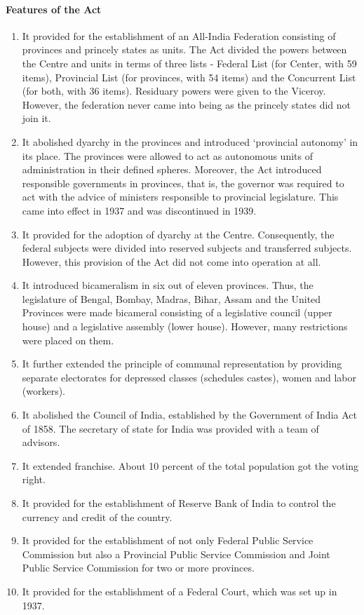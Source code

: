 \begin{multicols}{2}
\paragraph{Features of the Act}
\begin{enumerate}
  \item It provided for the establishment of an All-India Federation consisting of provinces and princely states as units. The Act divided the powers between the Centre and units in terms of three lists - Federal List (for Center, with 59 items), Provincial List (for provinces, with 54 items) and the Concurrent List (for both, with 36 items). Residuary powers were given to the Viceroy. However, the federation never came into being as the princely states did not join it.
  \item It abolished dyarchy in the provinces and introduced `provincial autonomy' in its place. The provinces were allowed to act as autonomous units of administration in their defined spheres. Moreover, the Act introduced responsible governments in provinces, that is, the governor was required to act with the advice of ministers responsible to provincial legislature. This came into effect in 1937 and was discontinued in 1939.
  \item It provided for the adoption of dyarchy at the Centre. Consequently, the federal subjects were divided into reserved subjects and transferred subjects. However, this provision of the Act did not come into operation at all.
  \item It introduced bicameralism in six out of eleven provinces. Thus, the legislature of Bengal, Bombay, Madras, Bihar, Assam and the United Provinces were made bicameral consisting of a legislative council (upper house) and a legislative assembly (lower house). However, many restrictions were placed on them.
  \item It further extended the principle of communal representation by providing separate electorates for depressed classes (schedules castes), women and labor (workers).
  \item It abolished the Council of India, established by the Government of India Act of 1858. The secretary of state for India was provided with a team of advisors.
  \item It extended franchise. About 10 percent of the total population got the voting right.
  \item It provided for the establishment of Reserve Bank of India to control the currency and credit of the country.
  \item It provided for the establishment of not only Federal Public Service Commission but also a Provincial Public Service Commission and Joint Public Service Commission for two or more provinces.
  \item It provided for the establishment of a Federal Court, which was set up in 1937.
\end{enumerate}


\end{multicols}
